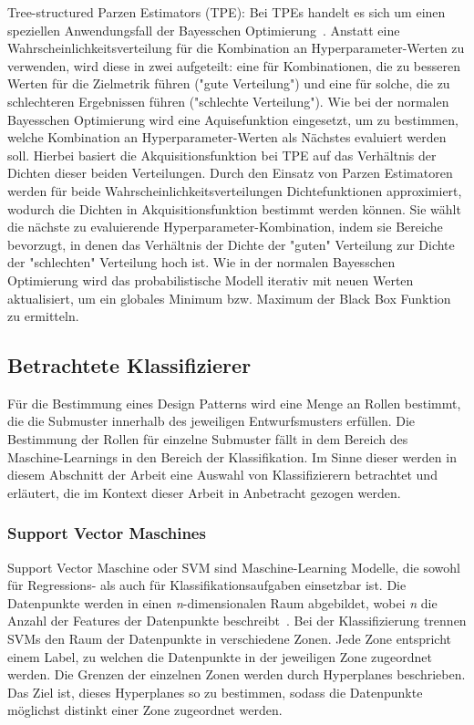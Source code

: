 \begin{description}
    \item Tree-structured Parzen Estimators (TPE): Bei TPEs handelt es sich um einen speziellen Anwendungsfall der Bayesschen Optimierung~\cite[S. 4 - 5]{bergstra2011algorithms}. Anstatt eine Wahrscheinlichkeitsverteilung für die Kombination an Hyperparameter-Werten zu verwenden, wird diese in zwei aufgeteilt:
    eine für Kombinationen, die zu besseren Werten für die Zielmetrik führen ("gute Verteilung") und eine für solche, die zu schlechteren Ergebnissen führen ("schlechte Verteilung"). Wie bei der normalen Bayesschen Optimierung wird eine Aquisefunktion eingesetzt, um zu bestimmen, welche Kombination an Hyperparameter-Werten als Nächstes evaluiert werden soll.
    Hierbei basiert die Akquisitionsfunktion bei TPE auf das Verhältnis der Dichten dieser beiden Verteilungen. Durch den Einsatz von Parzen Estimatoren werden für beide Wahrscheinlichkeitsverteilungen Dichtefunktionen approximiert, wodurch die Dichten in Akquisitionsfunktion bestimmt werden können.
    Sie wählt die nächste zu evaluierende Hyperparameter-Kombination, indem sie Bereiche bevorzugt, in denen das Verhältnis der Dichte der "guten" Verteilung zur Dichte der "schlechten" Verteilung hoch ist.
    Wie in der normalen Bayesschen Optimierung wird das probabilistische Modell iterativ mit neuen Werten aktualisiert, um ein globales Minimum bzw. Maximum der Black Box Funktion zu ermitteln.

\end{description}

\pagebreak

\subsection{Betrachtete Klassifizierer} \label{classifiers}
Für die Bestimmung eines Design Patterns wird eine Menge an Rollen bestimmt, die die Submuster innerhalb des jeweiligen Entwurfsmusters erfüllen.
Die Bestimmung der Rollen für einzelne Submuster fällt in dem Bereich des Maschine-Learnings in den Bereich der Klassifikation. Im Sinne dieser werden in diesem Abschnitt der Arbeit eine Auswahl von Klassifizierern betrachtet und erläutert,
die im Kontext dieser Arbeit in Anbetracht gezogen werden.

\subsubsection*{Support Vector Maschines}

Support Vector Maschine oder SVM sind Maschine-Learning Modelle, die sowohl für Regressions- als auch für Klassifikationsaufgaben einsetzbar ist. Die Datenpunkte werden in einen \textit{n}-dimensionalen Raum abgebildet, wobei \textit{n} die Anzahl der Features der Datenpunkte beschreibt~\cite[S. 435]{10.5555/3133359}.
Bei der Klassifizierung trennen SVMs den Raum der Datenpunkte in verschiedene Zonen. Jede Zone entspricht einem Label, zu welchen die Datenpunkte in der jeweiligen Zone zugeordnet werden. Die Grenzen der einzelnen Zonen werden durch Hyperplanes beschrieben. Das Ziel ist, dieses Hyperplanes so zu bestimmen,
sodass die Datenpunkte möglichst distinkt einer Zone zugeordnet werden.

